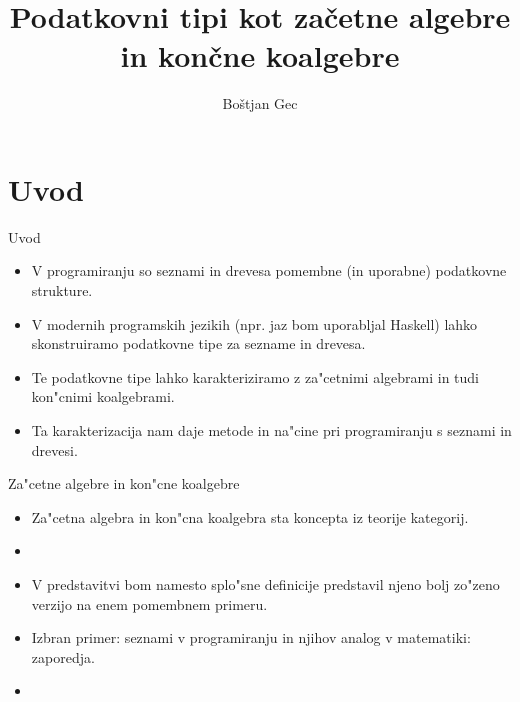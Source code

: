 \documentclass[t,usenames,dvipsnames]{beamer} %
\title{Podatkovni tipi kot začetne algebre in končne koalgebre}
\author{Boštjan Gec}
\institute{mentor: prof. dr. Simpson Alex}
\newcommand{\fillblack}[1]{
	\begin{tikzpicture}[remember picture, overlay]
	\node [shift={(0 cm,0cm)}]  at (current page.south west)
	{%
		\begin{tikzpicture}[remember picture, overlay] at (current page.south west)
		\draw [fill=black] (0, 0) -- (0,#1 \paperheight) --
		(\paperwidth,#1 \paperheight) -- (\paperwidth,0) -- cycle ;
		\end{tikzpicture}
	};
	\draw (current page.north west) rectangle (current page.south east);
\end{tikzpicture}
}
\begin{document}
\begin{frame}
  \maketitle
\end{frame}


\section{Uvod}

\begin{frame}{Uvod}
	\begin{itemize}
		\item V programiranju so seznami in drevesa pomembne (in uporabne) podatkovne strukture.
		
		\item V modernih programskih jezikih (npr. jaz bom uporabljal Haskell) lahko skonstruiramo podatkovne tipe za sezname in drevesa.
		
		\item Te podatkovne tipe lahko karakteriziramo z za"cetnimi algebrami in tudi kon"cnimi koalgebrami.
		
		\item Ta karakterizacija nam daje metode in na"cine pri programiranju s seznami in drevesi.
	\end{itemize}
\end{frame}
\begin{frame}{Za"cetne algebre in kon"cne koalgebre}
	\begin{itemize}
		\item 	Za"cetna algebra in kon"cna koalgebra sta koncepta iz teorije kategorij.
		
		\item 
		
		\item V predstavitvi bom namesto splo"sne definicije predstavil njeno bolj zo"zeno verzijo na enem pomembnem primeru.
		
		\item Izbran primer: seznami v programiranju in njihov analog v matematiki: zaporedja.
		
		\item 
	\end{itemize}
\end{frame}
\end{document}
